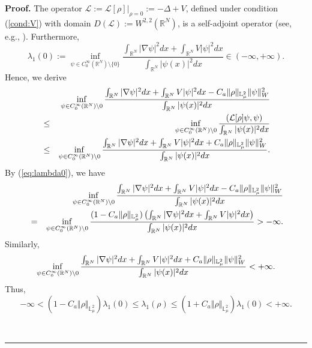 \documentclass[12pt,thmsa]{article}
\newenvironment{proof}[1][Proof]{\noindent\textbf{#1.} }{\ \rule{0.5em}{0.5em}}
\begin{document}
\begin{proof}
The operator $\mathcal{L}:=\mathcal{L}[\rho ]|_{\rho =0}:=-\Delta +V$,
defined under condition (\ref{cond:V}) with domain $D(\mathcal{L}):=W^{2,2}(%
\mathbb{R}^{N})$, is a self-adjoint operator (see, e.g., \cite{SimonReed}).
Furthermore,
\begin{equation}
\lambda _{1}(0):=\inf_{\psi \in C_{0}^{\infty }(\mathbb{R}^{N})\setminus
\{0\}}\frac{\int_{\mathbb{R}^{N}}|\nabla \psi |^{2}dx+\int_{\mathbb{R}%
^{N}}V|\psi |^{2}dx}{\int_{\mathbb{R}^{N}}|\psi (x)|^{2}dx}\in (-\infty
,+\infty ).  \label{eq:lambda0}
\end{equation}%
Hence, we derive
\begin{eqnarray*}
&&\inf_{\psi \in C_{0}^{\infty }(\mathbb{R}^{N})\setminus 0}\frac{\int_{%
\mathbb{R}^{N}}|\nabla \psi |^{2}dx+\int_{\mathbb{R}^{N}}V|\psi
|^{2}dx-C_{a}\Vert \rho \Vert _{\mathbb{L}_{\mu }^{2}}\Vert \psi \Vert
_{W}^{2}}{\int_{\mathbb{R}^{N}}|\psi (x)|^{2}dx} \\
&\leq &\inf_{\psi \in C_{0}^{\infty }(\mathbb{R}^{N})\setminus 0}\frac{(%
\mathcal{L}[\rho ]\psi ,\psi )}{\int_{\mathbb{R}^{N}}|\psi (x)|^{2}dx} \\
&\leq &\inf_{\psi \in C_{0}^{\infty }(\mathbb{R}^{N})\setminus 0}\frac{\int_{%
\mathbb{R}^{N}}|\nabla \psi |^{2}dx+\int_{\mathbb{R}^{N}}V|\psi
|^{2}dx+C_{a}\Vert \rho \Vert _{\mathbb{L}_{\mu }^{2}}\Vert \psi \Vert
_{W}^{2}}{\int_{\mathbb{R}^{N}}|\psi (x)|^{2}dx}.
\end{eqnarray*}%
By (\ref{eq:lambda0}), we have
\begin{eqnarray*}
&&\inf_{\psi \in C_{0}^{\infty }(\mathbb{R}^{N})\setminus 0}\frac{\int_{%
\mathbb{R}^{N}}|\nabla \psi |^{2}dx+\int_{\mathbb{R}^{N}}V|\psi
|^{2}dx-C_{a}\Vert \rho \Vert _{\mathbb{L}_{\mu }^{2}}\Vert \psi \Vert
_{W}^{2}}{\int_{\mathbb{R}^{N}}|\psi (x)|^{2}dx} \\
&=&\inf_{\psi \in C_{0}^{\infty }(\mathbb{R}^{N})\setminus 0}\frac{%
(1-C_{a}\Vert \rho \Vert _{\mathbb{L}_{\mu }^{2}})\left( \int_{\mathbb{R}%
^{N}}|\nabla \psi |^{2}dx+\int_{\mathbb{R}^{N}}V|\psi |^{2}dx\right) }{\int_{%
\mathbb{R}^{N}}|\psi (x)|^{2}dx}>-\infty .
\end{eqnarray*}%
Similarly,
\begin{equation*}
\inf_{\psi \in C_{0}^{\infty }(\mathbb{R}^{N})\setminus 0}\frac{\int_{%
\mathbb{R}^{N}}|\nabla \psi |^{2}dx+\int_{\mathbb{R}^{N}}V|\psi
|^{2}dx+C_{a}\Vert \rho \Vert _{\mathbb{L}_{\mu }^{2}}\Vert \psi \Vert
_{W}^{2}}{\int_{\mathbb{R}^{N}}|\psi (x)|^{2}dx}<+\infty .
\end{equation*}%
Thus,
\begin{equation}
-\infty <(1-C_{a}\Vert \rho \Vert _{\mathbb{L}_{\mu }^{2}})\lambda
_{1}(0)\leq \lambda _{1}(\rho )\leq (1+C_{a}\Vert \rho \Vert _{\mathbb{L}%
_{\mu }^{2}})\lambda _{1}(0)<+\infty .  \label{eq:lamlamlam}
\end{equation}


\end{proof}
\end{document}
